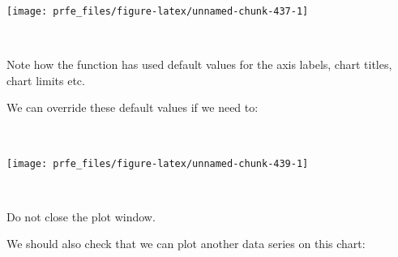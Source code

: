 \documentclass[12pt,a4paper]{book}
\newenvironment{Shaded}{\begin{snugshade}}{\end{snugshade}}
\newcommand{\KeywordTok}[1]{\textcolor[rgb]{0.13,0.29,0.53}{\textbf{#1}}}
\newcommand{\DataTypeTok}[1]{\textcolor[rgb]{0.13,0.29,0.53}{#1}}
\newcommand{\DecValTok}[1]{\textcolor[rgb]{0.00,0.00,0.81}{#1}}
\newcommand{\StringTok}[1]{\textcolor[rgb]{0.31,0.60,0.02}{#1}}
\newcommand{\OtherTok}[1]{\textcolor[rgb]{0.56,0.35,0.01}{#1}}
\newcommand{\OperatorTok}[1]{\textcolor[rgb]{0.81,0.36,0.00}{\textbf{#1}}}
\newcommand{\NormalTok}[1]{#1}
\theoremstyle{definition}
\theoremstyle{definition}
\theoremstyle{definition}
\theoremstyle{remark}
\begin{document}
\begin{center}\texttt{[image: prfe\_files/figure-latex/unnamed-chunk-437-1]} \end{center}

~

Note how the function has used default values for the axis labels, chart
titles, chart limits etc.

We can override these default values if we need to:

~

\begin{Shaded}
\end{Shaded}

\newpage

\begin{center}\texttt{[image: prfe\_files/figure-latex/unnamed-chunk-439-1]} \end{center}

~

Do not close the plot window.

We should also check that we can plot another data series on this chart:

~

\begin{Shaded}
\end{Shaded}
\end{document}
